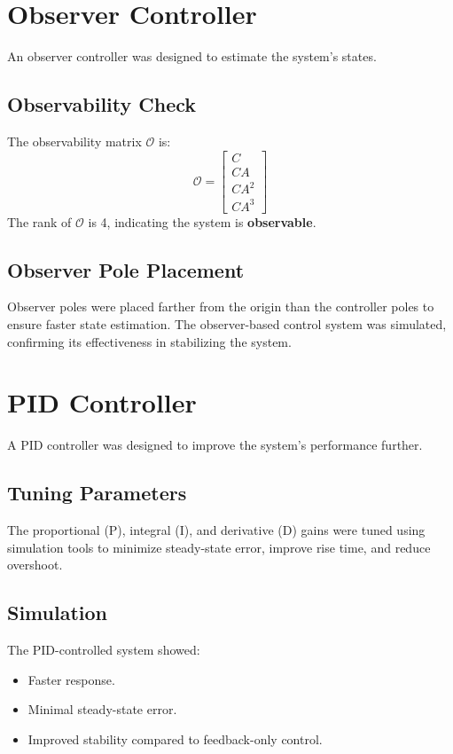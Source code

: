 \documentclass[a4paper,12pt]{article}
\begin{document}
\section*{Observer Controller}
An observer controller was designed to estimate the system's states.

\subsection*{Observability Check}
The observability matrix \( \mathcal{O} \) is:
\[
\mathcal{O} = \begin{bmatrix}
C \\
CA \\
CA^2 \\
CA^3
\end{bmatrix}
\]
The rank of \( \mathcal{O} \) is 4, indicating the system is \textbf{observable}.

\subsection*{Observer Pole Placement}
Observer poles were placed farther from the origin than the controller poles to ensure faster state estimation. The observer-based control system was simulated, confirming its effectiveness in stabilizing the system.

\section*{PID Controller}
A PID controller was designed to improve the system's performance further.

\subsection*{Tuning Parameters}
The proportional (P), integral (I), and derivative (D) gains were tuned using simulation tools to minimize steady-state error, improve rise time, and reduce overshoot.

\subsection*{Simulation}
The PID-controlled system showed:
\begin{itemize}
    \item Faster response.
    \item Minimal steady-state error.
    \item Improved stability compared to feedback-only control.
\end{itemize}
\end{document}
